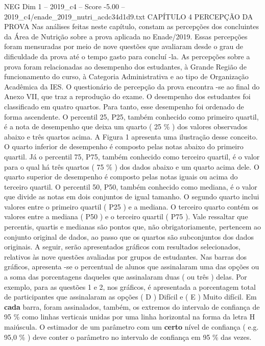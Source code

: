 \begin{textsample}{NEG Dim 1 – 2019\_c4 – Score -5.00 – 2019\_c4/enade\_2019\_nutri\_acdc34d1d9.txt}  \label{ex:f1_neg_087}
CAPÍTULO 4 PERCEPÇÃO DA PROVA Nas análises feitas neste capítulo, constam as percepções dos concluintes da Área de Nutrição sobre a prova aplicada no Enade/2019.
Essas percepções foram mensuradas por meio de nove questões que avaliaram desde o grau de dificuldade da prova até o tempo gasto para concluí -la.
As percepções sobre a prova foram relacionadas ao desempenho dos estudantes, à Grande Região de funcionamento do curso, à Categoria Administrativa e ao tipo de Organização Acadêmica da IES.
O questionário de percepção da prova encontra -se ao final do Anexo VII, que traz a reprodução do exame.
O desempenho dos estudantes foi classificado em quatro quartos.
Para tanto, esse desempenho foi ordenado de forma ascendente.
O percentil 25, P25, também conhecido como primeiro quartil, é a nota de desempenho que deixa um quarto ( 25 \% ) dos valores observados abaixo e três quartos acima.
A Figura 1 apresenta uma ilustração desse conceito.
O quarto inferior de desempenho é composto pelas notas abaixo do primeiro quartil.
Já o percentil 75, P75, também conhecido como terceiro quartil, é o valor para o qual há três quartos ( 75 \% ) dos dados abaixo e um quarto acima dele.
O quarto superior de desempenho é composto pelas notas iguais ou acima do terceiro quartil.
O percentil 50, P50, também conhecido como mediana, é o valor que divide as notas em dois conjuntos de igual tamanho.
O segundo quarto inclui valores entre o primeiro quartil ( P25 ) e a mediana.
O terceiro quarto contém os valores entre a mediana ( P50 ) e o terceiro quartil ( P75 ).
Vale ressaltar que percentis, quartis e medianas são pontos que, não obrigatoriamente, pertencem ao conjunto original de dados, ao passo que os quartos são subconjuntos dos dados originais.
A seguir, serão apresentados gráficos com resultados selecionados, relativos às nove questões avaliadas por grupos de estudantes.
Nas barras dos gráficos, apresenta -se o percentual de alunos que assinalaram uma das opções ou a soma das porcentagens daqueles que assinalaram duas ( ou três ) delas.
Por exemplo, para as questões 1 e 2, nos gráficos, é apresentada a porcentagem total de participantes que assinalaram as opções ( D ) Difícil e ( E ) Muito difícil.
Em \textbf{cada} barra, foram assinalados, também, os extremos do intervalo de confiança de 95 \% como linhas verticais unidas por uma linha horizontal na forma da letra H maiúscula.
O estimador de um parâmetro com um \textbf{certo} nível de confiança ( e.g. 95,0 \% ) deve conter o parâmetro no intervalo de confiança em 95 \% das vezes.

\end{textsample}
